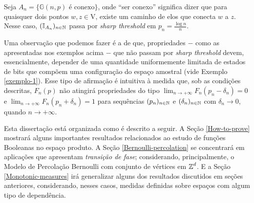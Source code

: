 \begin{myexp}\label{exemplo-2}
	Seja $A_n = \{\mathbb{G}(n, p) \text{ é conexo}\}$, onde ``ser conexo'' significa dizer que para quaisquer dois pontos $w, z \in \text{V}$, existe um caminho de elos que conecta $w$ a $z$. Nesse caso, $(\operatorname{\mathbb{I}}_{A_n})_{n \in \operatorname{\mathbb{N}}}$ passa por \textit{sharp threshold} em $p_n = \frac{\log n}{n}$.
\end{myexp}


\par Uma observação que podemos fazer é a de que, propriedades $-$ como as apresentadas nos exemplos acima $-$ que não passam por \textit{sharp threshold} devem, essencialmente, depender de uma quantidade uniformemente limitada de estados de bits que compõem uma configuração do espaço amostral (vide Exemplo \ref{exemplo-1}). Esse tipo de afirmação é intuitiva à medida que, sob as condições descritas, $F_n(p)$ não atingirá propriedades do tipo $\lim_{n \rightarrow + \infty}F_n(p_n - \delta_n) = 0$ e $\lim_{n \rightarrow + \infty}F_n(p_n + \delta_n) = 1$ para sequências $(p_n)_{n \in \operatorname{\mathbb{N}}}$ e $(\delta_n)_{n \in \operatorname{\mathbb{N}}}$ com $\delta_n \to 0$, quando $n \rightarrow +\infty$.

\par Esta dissertação está organizada como é descrito a seguir. A Seção \ref{How-to-prove} mostrará alguns importantes resultados relacionados ao estudo de funções Booleanas no espaço produto. A Seção \ref{Bernoulli-percolation} se concentrará em aplicações que apresentam \textit{transição de fase}; considerando, principalmente, o Modelo de Percolação Bernoulli com conjunto de vértices em $\operatorname{\mathbb{Z}}^d$. E a Seção \ref{Monotonic-measures} irá generalizar alguns dos resultados discutidos em seções anteriores, considerando, nesses casos, medidas definidas sobre espaços com algum tipo de dependência.
